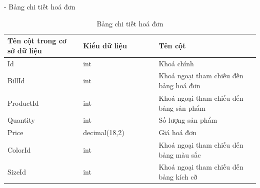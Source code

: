 - Bảng chi tiết hoá đơn
\begin{longtable}[htp]{ |m{0.3\linewidth}|m{0.3\linewidth}|m{0.4\linewidth}|}
\caption{Bảng chi tiết hoá đơn \label{database}}\\
\hline
Tên cột trong cơ sở dữ liệu & Kiểu dữ liệu & Tên cột  \\
\hline
Id&int&Khoá chính\\
\hline
BillId&int&Khoá ngoại tham chiếu đến bảng hoá đơn\\
\hline
ProductId&int&Khoá ngoại tham chiếu đến bảng sản phẩm\\
\hline
Quantity&int&Số lượng sản phẩm\\
\hline
Price&decimal(18,2)&Giá hoá đơn\\
\hline
ColorId&int&Khoá ngoại tham chiếu đến bảng màu sắc\\
\hline
SizeId&int&Khoá ngoại tham chiếu đến bảng kích cỡ\\
\hline
\end{longtable}
